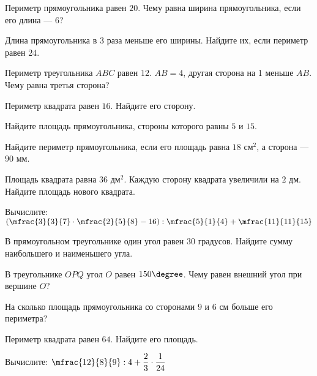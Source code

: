 \begin{class}[number=4]
	\begin{listofex}
		\item Периметр прямоугольника равен \( 20 \). Чему равна ширина прямоугольника, если его длина --- \( 6 \)?
		\item Длина прямоугольника в \( 3 \) раза меньше его ширины. Найдите их, если периметр равен \( 24 \).
		\item Периметр треугольника \( ABC \) равен \( 12 \). \( AB=4 \), другая сторона на 1 меньше \( AB \). Чему равна третья сторона?
		\item Периметр квадрата равен \( 16 \). Найдите его сторону.
		\item Найдите площадь прямоугольника, стороны которого равны \( 5 \) и \( 15 \).
		\item Найдите периметр прямоугольника, если его площадь равна \( 18 \) см\( ^2 \), а сторона --- \( 90 \) мм.
		\item Площадь квадрата равна \( 36 \) дм\( ^2 \). Каждую сторону квадрата увеличили на \( 2 \) дм. Найдите площадь нового квадрата.
		\item Вычислите: \quad \( \left( \mfrac{3}{3}{7}\cdot\mfrac{2}{5}{8}-16 \right):\mfrac{5}{1}{4}+\mfrac{11}{11}{15}  \)
	\end{listofex}
\end{class}

\begin{homework}[number=2]
	\begin{listofex}
		\item В прямоугольном треугольнике один угол равен \( 30 \) градусов. Найдите сумму наибольшего и наименьшего угла. 
		\item В треугольнике \( OPQ \) угол \( O \) равен \( 150\degree \). Чему равен внешний угол при вершине \( O \)?
		\item На сколько площадь прямоугольника со сторонами \( 9 \) и \( 6 \) см больше его периметра?
		\item Периметр квадрата равен \( 64 \). Найдите его площадь.
		\item Вычислите: \quad \( \mfrac{12}{8}{9}:4+\dfrac{2}{3}\cdot\dfrac{1}{24} \)
	\end{listofex}
\end{homework}

